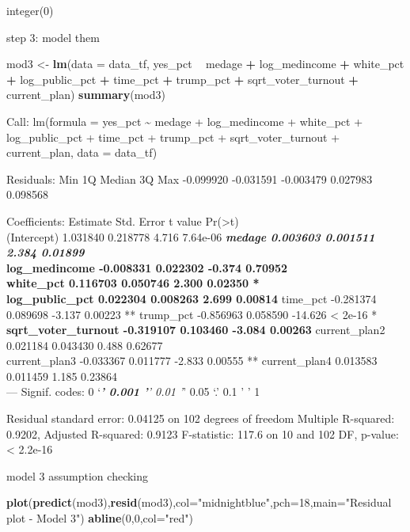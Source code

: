 \documentclass[
]{article}
\newenvironment{Shaded}{\begin{snugshade}}{\end{snugshade}}
\newcommand{\DataTypeTok}[1]{\textcolor[rgb]{0.13,0.29,0.53}{#1}}
\newcommand{\DecValTok}[1]{\textcolor[rgb]{0.00,0.00,0.81}{#1}}
\newcommand{\KeywordTok}[1]{\textcolor[rgb]{0.13,0.29,0.53}{\textbf{#1}}}
\newcommand{\NormalTok}[1]{#1}
\newcommand{\OperatorTok}[1]{\textcolor[rgb]{0.81,0.36,0.00}{\textbf{#1}}}
\newcommand{\StringTok}[1]{\textcolor[rgb]{0.31,0.60,0.02}{#1}}
\begin{document}
integer(0)

step 3: model them

\begin{Shaded}
\begin{Highlighting}[]
\NormalTok{mod3 <-}\StringTok{ }\KeywordTok{lm}\NormalTok{(}\DataTypeTok{data =}\NormalTok{ data_tf, yes_pct }\OperatorTok{~}\StringTok{ }\NormalTok{medage }\OperatorTok{+}\StringTok{ }\NormalTok{log_medincome }\OperatorTok{+}\StringTok{ }\NormalTok{white_pct }\OperatorTok{+}\StringTok{ }\NormalTok{log_public_pct }\OperatorTok{+}\StringTok{ }\NormalTok{time_pct }\OperatorTok{+}\StringTok{ }\NormalTok{trump_pct }\OperatorTok{+}\StringTok{ }\NormalTok{sqrt_voter_turnout }\OperatorTok{+}\StringTok{ }\NormalTok{current_plan)}
\KeywordTok{summary}\NormalTok{(mod3)}
\end{Highlighting}
\end{Shaded}

Call: lm(formula = yes\_pct \textasciitilde{} medage + log\_medincome +
white\_pct + log\_public\_pct + time\_pct + trump\_pct +
sqrt\_voter\_turnout + current\_plan, data = data\_tf)

Residuals: Min 1Q Median 3Q Max -0.099920 -0.031591 -0.003479 0.027983
0.098568

Coefficients: Estimate Std. Error t value
Pr(\textgreater\textbar t\textbar)\\
(Intercept) 1.031840 0.218778 4.716 7.64e-06 \textbf{\emph{ medage
0.003603 0.001511 2.384 0.01899 }\\
log\_medincome -0.008331 0.022302 -0.374 0.70952\\
white\_pct 0.116703 0.050746 2.300 0.02350 *\\
log\_public\_pct 0.022304 0.008263 2.699 0.00814 } time\_pct -0.281374
0.089698 -3.137 0.00223 ** trump\_pct -0.856963 0.058590 -14.626
\textless{} 2e-16 *\textbf{ sqrt\_voter\_turnout -0.319107 0.103460
-3.084 0.00263 } current\_plan2 0.021184 0.043430 0.488 0.62677\\
current\_plan3 -0.033367 0.011777 -2.833 0.00555 ** current\_plan4
0.013583 0.011459 1.185 0.23864\\
--- Signif. codes: 0 `\emph{\textbf{' 0.001 '}' 0.01 '}' 0.05 `.' 0.1 '
' 1

Residual standard error: 0.04125 on 102 degrees of freedom Multiple
R-squared: 0.9202, Adjusted R-squared: 0.9123 F-statistic: 117.6 on 10
and 102 DF, p-value: \textless{} 2.2e-16

model 3 assumption checking

\begin{Shaded}
\begin{Highlighting}[]
\KeywordTok{plot}\NormalTok{(}\KeywordTok{predict}\NormalTok{(mod3),}\KeywordTok{resid}\NormalTok{(mod3),}\DataTypeTok{col=}\StringTok{"midnightblue"}\NormalTok{,}\DataTypeTok{pch=}\DecValTok{18}\NormalTok{,}\DataTypeTok{main=}\StringTok{"Residual plot - Model 3"}\NormalTok{)}
\KeywordTok{abline}\NormalTok{(}\DecValTok{0}\NormalTok{,}\DecValTok{0}\NormalTok{,}\DataTypeTok{col=}\StringTok{"red"}\NormalTok{)}
\end{Highlighting}
\end{Shaded}
\end{document}
